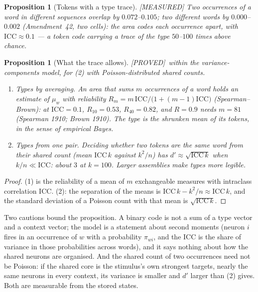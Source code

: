 \documentclass[11pt]{article}
\theoremstyle{definition}
\theoremstyle{plain}
\newtheorem{proposition}[lemma]{Proposition}
\newcommand{\PROVED}{\textnormal{\footnotesize\textsf{[PROVED]}}}
\newcommand{\MEASURED}{\textnormal{\footnotesize\textsf{[MEASURED]}}}
\begin{document}
\begin{proposition}[Tokens with a type trace]\label{prop:icc} \MEASURED
Two occurrences of a word in different sequences overlap by $0.072$--$0.105$;
two different words by $0.000$--$0.002$ (Amendment~42, two cells): the area
codes each occurrence apart, with $\mathrm{ICC} \approx 0.1$ --- a token code
carrying a trace of the type $50$--$100$ times above chance.
\end{proposition}

\begin{proposition}[What the trace allows]\label{prop:sb} \PROVED\ within the
variance-components model, for (2) with Poisson-distributed shared counts.
\begin{enumerate}
\item \emph{Types by averaging.} An area that sums $m$ occurrences of a word
  holds an estimate of $\mu_w$ with reliability
  $R_m = m\,\mathrm{ICC}/\bigl(1+(m-1)\mathrm{ICC}\bigr)$ (Spearman--Brown): at
  $\mathrm{ICC} = 0.1$, $R_{10} = 0.53$, $R_{40} = 0.82$, and $R = 0.9$ needs
  $m = 81$ (Spearman 1910; Brown 1910). The type is the shrunken mean of its
  tokens, in the sense of empirical Bayes.
\item \emph{Types from one pair.} Deciding whether two tokens are the same word
  from their shared count (mean $\mathrm{ICC}\,k$ against $k^2/n$) has
  $d' \approx \sqrt{\mathrm{ICC}\,k}$ when $k/n \ll \mathrm{ICC}$: about $3$ at
  $k = 100$. Larger assemblies make types more legible.
\end{enumerate}
\end{proposition}

\begin{proof}
(1) is the reliability of a mean of $m$ exchangeable measures with
intraclass correlation $\mathrm{ICC}$. (2): the separation of the means is
$\mathrm{ICC}\,k - k^2/n \approx \mathrm{ICC}\,k$, and the standard deviation of a
Poisson count with that mean is $\sqrt{\mathrm{ICC}\,k}$.
\end{proof}

Two cautions bound the proposition. A binary code is not a sum of a type
vector and a context vector; the model is a statement about second moments
(neuron $i$ fires in an occurrence of $w$ with a probability $\pi_{wi}$, and the
ICC is the share of variance in those probabilities across words), and it says
nothing about how the shared neurons are organised. And the shared count of
two occurrences need not be Poisson: if the shared core is the stimulus's own
strongest targets, nearly the same neurons in every context, its variance is
smaller and $d'$ larger than (2) gives. Both are measurable from the stored
states.
\end{document}
